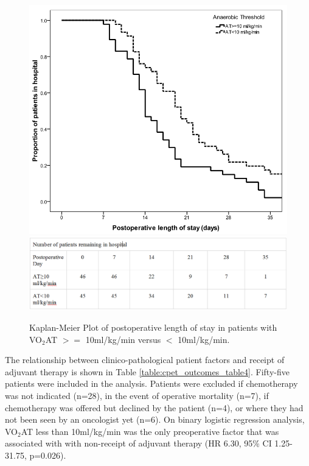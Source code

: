 

\begin{figure}[h]
\centering
\includegraphics[width=0.8\linewidth]{Figures/cpet_outcomes_km_at_los}
\includegraphics[width=1\linewidth]{Figures/cpet_outcomes_km_at_los_table} %
\caption{Kaplan-Meier Plot of postoperative length of stay in patients with VO$_2$AT $>=$ 10ml/kg/min versus $<$ 10ml/kg/min.}
\label{fig:cpet_outcomes_km_at_los}
\end{figure}

The relationship between clinico-pathological patient factors and receipt of adjuvant therapy is shown in Table \ref{table:cpet_outcomes_table4}. 
Fifty-five patients were included in the analysis. 
Patients were excluded if chemotherapy was not indicated (n=28), in the event of operative mortality (n=7), if chemotherapy was offered but declined by the patient (n=4), or where they had not been seen by an oncologist yet (n=6). 
On binary logistic regression analysis, VO$_2$AT less than 10ml/kg/min was the only preoperative factor that was associated with with non-receipt of adjuvant therapy (HR 6.30, 95\% CI 1.25-31.75, p=0.026). 



